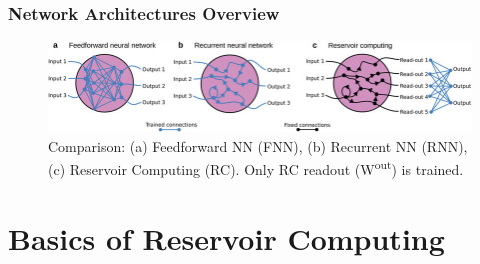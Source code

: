 \documentclass{beamer}
\begin{document}
\begin{frame}
    \frametitle{Network Architectures Overview}
    \begin{figure}
        \centering
        \includegraphics[width=1.0\linewidth]{figures/rc_difference_with others.png}
        \caption{Comparison: (a) Feedforward NN (FNN), (b) Recurrent NN (RNN), (c) Reservoir Computing (RC). Only RC readout (W\textsuperscript{out}) is trained.}
        \label{fig:rc_diff_slide}
    \end{figure}
\end{frame}

\section{Basics of Reservoir Computing}
\end{document}
